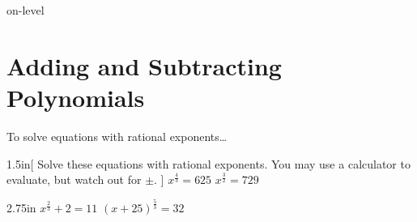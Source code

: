 \begin{taggedblock}{on-level}

\section{Adding and Subtracting Polynomials}

\begin{myConceptSteps}{To solve equations with rational exponents\dots}
\end{myConceptSteps}



\begin{my2Problems}[\large]{1.5in}[
        Solve these equations with rational exponents.
        You may use a calculator to evaluate, but watch out for {\Large$\pm$}.
        ]
    {
        $ x^{\frac{4}{3}} = 625 $
    }
    {
        $ x^{\frac{3}{2}} = 729 $
    }
\end{my2Problems}
\begin{my2Problems}[\large]{2.75in}
    {
        $ x^{\frac{2}{3}} + 2 = 11 $
    }
    {
        $ (x+25)^{\frac{5}{3}} = 32 $
    }
\end{my2Problems}


\end{taggedblock}